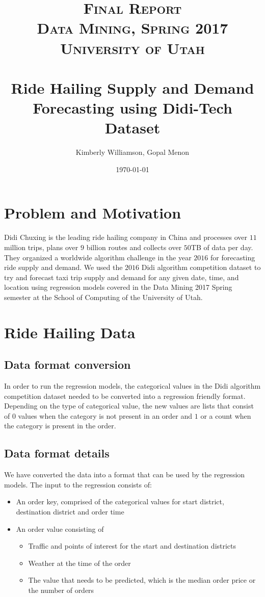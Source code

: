 \documentclass[paper=a4, fontsize=11pt]{scrartcl} %
\title{	
\normalfont \normalsize 
\textsc{Final Report\\Data Mining, Spring 2017\\University of Utah} \\ [25pt] %
\horrule{0.5pt} \\[0.4cm] %
\huge Ride Hailing Supply and Demand Forecasting using Didi-Tech Dataset  %
\horrule{2pt} \\[0.5cm] %
}
\author{Kimberly Williamson, Gopal Menon} %
\date{\normalsize\today} %
\numberwithin{equation}{section} %
\numberwithin{table}{section} %
\begin{document}
\maketitle %


\section{Problem and Motivation}
Didi Chuxing is the leading ride hailing company in China and processes over $11$ million trips, plans over $9$ billion routes and collects over $50$TB of data per day. They organized a worldwide algorithm challenge in the year $2016$ \cite{DidiPage} for forecasting ride supply and demand. We used the $2016$ Didi algorithm competition dataset to try and forecast taxi trip supply and demand for any given date, time, and location using regression models covered in the Data Mining 2017 Spring semester at the School of Computing of the University of Utah.

\section{Ride Hailing Data}

\subsection{Data format conversion}

In order to run the regression models, the categorical values in the Didi algorithm competition dataset needed to be converted into a regression friendly format. Depending on the type of categorical value, the new values are lists that consist of $0$ values when the category is not present in an order and $1$ or a count when the category is present in the order.

\subsection{Data format details}

We have converted the data into a format that can be used by the regression models. The input to the regression consists of:
\begin{itemize}
\item An order key, comprised of the categorical values for start district, destination district and order time
\item An order value consisting of
\begin{itemize}
\item Traffic and points of interest for the start and destination districts
\item Weather at the time of the order
\item The value that needs to be predicted, which is the median order price or the number of orders
\end{itemize}
\end{itemize}
\end{document}
